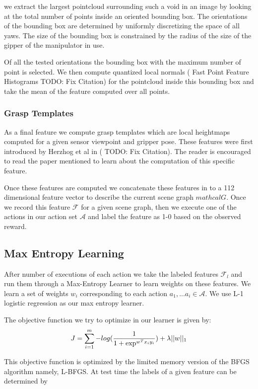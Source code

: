 we extract the largest pointcloud surrounding such a void in an image by looking at the total number of points inside an oriented bounding box. The orientations of the bounding box are determined by uniformly discretizing the space of all yaws. The size of the bounding box is constrained by the radius of the size of the gipper of the manipulator in use.

Of all the tested orientations the bounding box with the maximum number of point is selected. We then compute quantized local normals ( Fast Point Feature Histograms \cite{Javidi12_Journal} TODO: Fix Citation) for the pointcloud inside this bounding box and take the mean of the feature computed over all points.

\subsubsection{Grasp Templates}
As a final feature we compute grasp templates which are local heightmaps computed for a given sensor viewpoint and gripper pose. These features were first introduced by Herzhog et al in (\cite{Javidi12_Journal} TODO: Fix Citation). The reader is encouraged to read the paper mentioned to learn about the computation of this specific feature.

Once these features are computed we concatenate these features in to a 112 dimensional feature vector to describe the current scene graph $mathcal{G}$. Once we record this feature $\mathcal{F}$ for a given scene graph, then we execute one of the actions in our action set $\mathcal{A}$ and label the feature as 1-0 based on the observed reward.

\subsection{Max Entropy Learning}
After number of executions of each action we take the labeled features $\mathcal{F}_l$ and run them through a Max-Entropy Learner to learn weights on these features. We learn a set of weights $w_i$ corresponding to each action ${a_1,...a_i}\in \mathcal{A}$. We use L-1 logistic regression as our max entropy learner.

The objective function we try to optimize in our learner is given by:
\[
J = \sum_{i=1}^m-log(\frac{1}{1+\exp^{w^Tx_iy_i}}) + \lambda||w||_1\\
\]

This objective function is optimized by the limited memory version of the BFGS algorithm namely, L-BFGS. At test time the labels of a given feature can be determined by 


